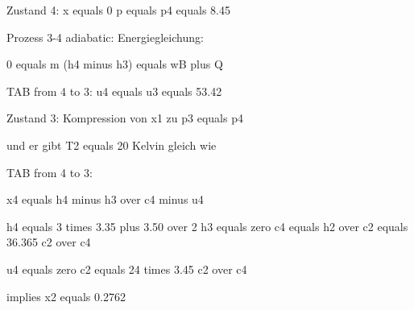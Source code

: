 Zustand 4: x equals 0  
p equals p4 equals 8.45  

Prozess 3-4 adiabatic:  
Energiegleichung:  

0 equals m (h4 minus h3) equals wB plus Q  

TAB from 4 to 3:  
u4 equals u3 equals 53.42  

Zustand 3: Kompression von x1 zu p3 equals p4  

und er gibt T2 equals 20 Kelvin gleich wie  

TAB from 4 to 3:  

x4 equals h4 minus h3 over c4 minus u4  

h4 equals 3 times 3.35 plus 3.50 over 2  
h3 equals zero  
c4 equals h2 over c2 equals 36.365 c2 over c4  

u4 equals zero c2 equals 24 times 3.45 c2 over c4  

implies x2 equals 0.2762